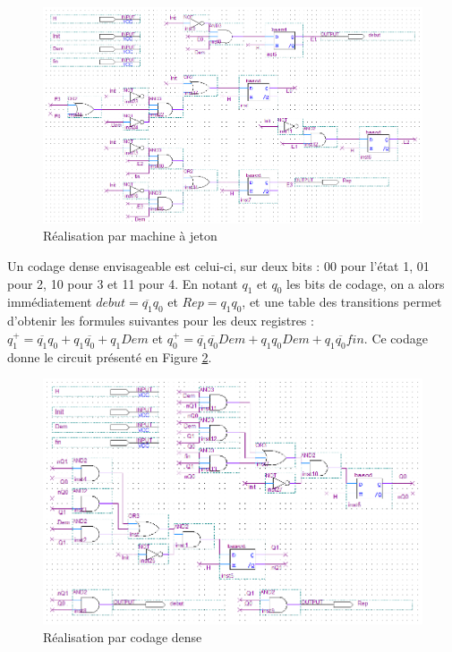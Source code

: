 \documentclass[a4paper,11pt]{article}
\begin{document}
\begin{figure}[h]
\center
\includegraphics[scale=0.57]{DemRep.png}
\caption{Réalisation par machine à jeton}
\label{demrepjeton}
\end{figure}

Un codage dense envisageable est celui-ci, sur deux bits : 00 pour l'état 1, 01 pour 2, 10 pour 3 et 11 pour 4. En notant $q_1$ et $q_0$ les bits de codage, on a alors immédiatement $debut=\overline{q_1}q_0$ et $Rep=q_1q_0$, et une table des transitions permet d'obtenir les formules suivantes pour les deux registres : $q_1^+=\overline{q_1}q_0 + q_1\overline{q_0} + q_1Dem$ et $q_0^+ = \overline{q_1}\overline{q_0}Dem + q_1q_0Dem + q_1\overline{q_0}fin$. Ce codage donne le circuit présenté en Figure \ref{demrepdense}.

\begin{figure}[h]
\center
\includegraphics[scale=0.6]{DemRep2.png}
\caption{Réalisation par codage dense}
\label{demrepdense}
\end{figure}
\end{document}
